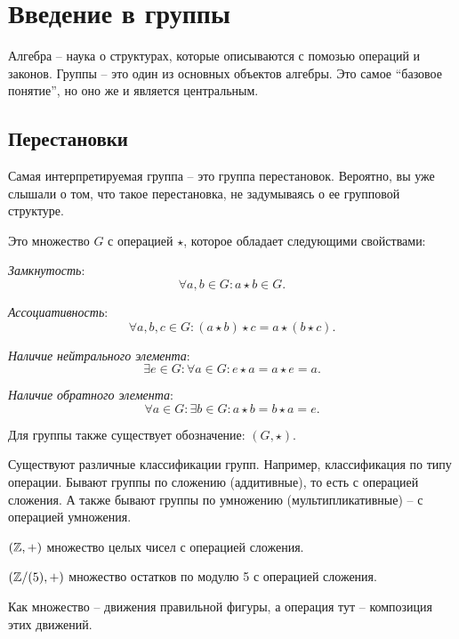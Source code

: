 \section{Введение в группы}

Алгебра -- наука о структурах, которые описываются с помозью операций и законов. 
Группы -- это один из основных объектов алгебры. Это самое ``базовое понятие'', 
но оно же и является центральным.

\subsection{Перестановки}

Самая интерпретируемая группа -- это группа перестановок.
Вероятно, вы уже слышали о том, что такое перестановка, не задумываясь о ее групповой структуре.

\begin{definition}
    [Группа]
    Это множество $G$ с операцией $\star$, которое обладает следующими свойствами: 
    \begin{conditions}
        \item \textit{Замкнутость}: $$\forall a, b \in G: a \star b \in G.$$
        \item \textit{Ассоциативность}: $$\forall a, b, c \in G: (a \star b) \star c = a \star (b \star c).$$
        \item \textit{Наличие нейтрального элемента}: $$\exists e \in G: \forall a \in G: e \star a = a \star e = a.$$
        \item \textit{Наличие обратного элемента}: $$\forall a \in G: \exists b \in G: a \star b = b \star a = e.$$
    \end{conditions}
    Для группы также существует обозначение: $(G, \star).$
\end{definition}

Существуют различные классификации групп. Например, классификация по типу операции. 
Бывают группы по сложению (аддитивные), то есть с операцией сложения. 
А также бывают группы по умножению (мультипликативные) -- с операцией умножения.

\begin{example}
        $(\mathbb Z, +)$ множество целых чисел с операцией сложения.
\end{example}
\begin{example}
    $({\mathbb Z}/{(5)}, +)$ множество остатков по модулю 5 с операцией сложения.
\end{example}
\begin{example}
    Как множество -- движения правильной фигуры, а операция тут -- композиция этих движений.
\end{example}

